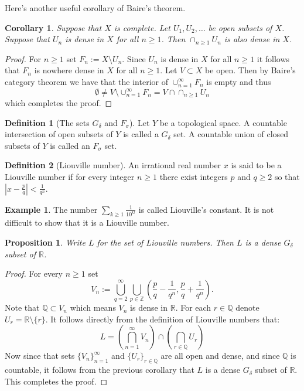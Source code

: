 \documentclass[11pt,a4paper]{article}
\theoremstyle{definition}
\newtheorem{definition}{Definition}[section]
\newtheorem{example}{Example}[section]
\theoremstyle{plain}
\newtheorem{proposition}[theorem]{Proposition}
\newtheorem{corollary}[theorem]{Corollary}
\newcommand{\Z}{\mathbb{Z}}
\newcommand{\Q}{\mathbb{Q}}
\newcommand{\R}{\mathbb{R}}
\newcommand{\abs}[1]{\left\lvert #1\right\rvert}
\begin{document}
  Here's another useful corollary of Baire's theorem.
  
  \begin{corollary}
    Suppose that $X$ is complete. Let $U_1,U_2,\dots$ be open subsets of $X$.
    Suppose that $U_n$ is dense in $X$ for all $n \geq 1$. Then 
    $\cap_{n \geq 1}{U_n}$ is also dense in $X$.
  \end{corollary}
  \begin{proof}
    For $n \geq 1$ set $F_n := X \setminus U_n$. Since $U_n$ is dense in $X$
    for all $n \geq 1$ it follows that $F_n$ is nowhere dense in $X$ for
    all $n \geq 1$. Let $V \subset X$ be open. Then by Baire's category
    theorem we have that the interior of $\cup_{n=1}^{\infty} F_n$ is
    empty and thus
    \[
      \emptyset \neq 
      V \setminus \cup_{n=1}^{\infty} F_n =
      V \cap \cap_{n \geq 1}{U_n}
    \]
    which completes the proof.
  \end{proof}
  
  \begin{definition}[The sets $G_\delta$ and $F_\sigma$]
    Let $Y$ be a topological space. A countable intersection of open
    subsets of $Y$ is called a $G_\delta$ set. A countable union of closed 		
    subsets of $Y$ is called an $F_\sigma$ set.
  \end{definition}

  \begin{definition}[Liouville number]
    An irrational real number $x$ is said to be a Liouville number if
    for every integer $n \geq 1$ there exist integers $p$ and $q \geq 2$ 
    so that $\abs{x - \frac{p}{q}} < \frac{1}{q^n}$.
  \end{definition}

  \begin{example}
    The number $\sum_{k \geq 1}{\frac{1}{10^{k!}}}$ is called Liouville’s 
    constant. It is not difficult to show that it is a Liouville number.
  \end{example}

  \begin{proposition}
    Write $L$ for the set of Liouville numbers. Then $L$ is a dense
    $G_\delta$ subset of $\R$.
  \end{proposition}
  \begin{proof}
    For every $n \geq 1$ set
    \[
      V_n := \bigcup_{q=2}^{\infty} \bigcup_{p \in \Z}
      \left(\frac{p}{q} - \frac{1}{q^n},\frac{p}{q} + \frac{1}{q^n}\right).
    \]
    Note that $\Q \subset V_n$ which means $V_n$ is dense in $\R$. For each
    $r \in \Q$ denote $U_r = \R \setminus \{r\}$. It follows directly from
    the definition of Liouville numbers that:
    \[
      L = \left(\bigcap_{n=1}^{\infty}{V_n}\right) \cap
        \left(\bigcap_{r \in \Q}{U_r}\right)
    \]
    Now since that sets $\{V_n\}_{n=1}^{\infty}$ and $\{U_r\}_{r \in \Q}$
    are all open and dense, and since $\Q$ is countable, it follows from
    the previous corollary that $L$ is a dense $G_\delta$ subset of $\R$.
    This completes the proof.
  \end{proof}
\end{document}
